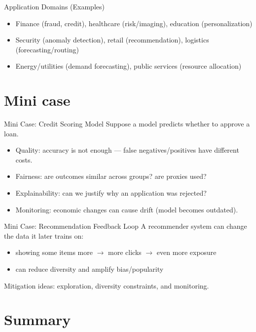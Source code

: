 \documentclass[aspectratio=169]{beamer}
\begin{document}
\begin{frame}{Application Domains (Examples)}
  \begin{itemize}[<+->]
    \item Finance (fraud, credit), healthcare (risk/imaging), education (personalization)
    \item Security (anomaly detection), retail (recommendation), logistics (forecasting/routing)
    \item Energy/utilities (demand forecasting), public services (resource allocation)
  \end{itemize}
\end{frame}

\section{Mini case}
\label{sec:case}

\begin{frame}{Mini Case: Credit Scoring Model}
  Suppose a model predicts whether to approve a loan.
  \vspace{0.4em}
  \begin{itemize}[<+->]
    \item Quality: accuracy is not enough --- false negatives/positives have different costs.
    \item Fairness: are outcomes similar across groups? are proxies used?
    \item Explainability: can we justify why an application was rejected?
    \item Monitoring: economic changes can cause drift (model becomes outdated).
  \end{itemize}
\end{frame}

\begin{frame}{Mini Case: Recommendation Feedback Loop}
  A recommender system can change the data it later trains on:
  \begin{itemize}[<+->]
    \item showing some items more $\rightarrow$ more clicks $\rightarrow$ even more exposure
    \item can reduce diversity and amplify bias/popularity
  \end{itemize}
  \vspace{0.4em}
  Mitigation ideas: exploration, diversity constraints, and monitoring.
\end{frame}

\section{Summary}
\label{sec:summary}
\end{document}
